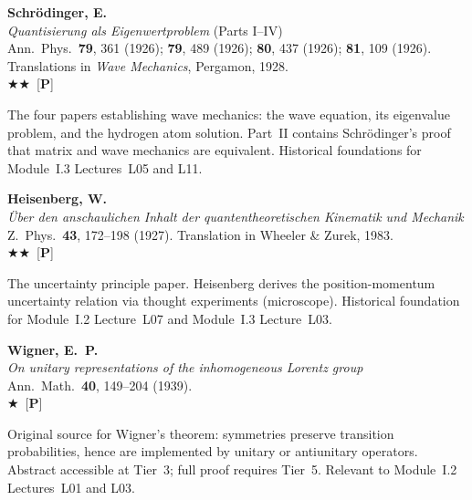 \documentclass[11pt,a4paper]{article}
\newcommand{\recommended}{$\bigstar\bigstar$}
\newcommand{\useful}{$\bigstar$}
\newenvironment{bibentry}[1]{\begin{tcolorbox}[entrybox=#1,top=4pt,bottom=4pt]}{\end{tcolorbox}\smallskip}
\begin{document}
\begin{bibentry}{t3light}
\textbf{Schr\"odinger, E.}\\
\textit{Quantisierung als Eigenwertproblem} (Parts I--IV)\\
Ann.~Phys.~\textbf{79}, 361 (1926); \textbf{79}, 489 (1926); \textbf{80}, 437 (1926);
\textbf{81}, 109 (1926). Translations in \textit{Wave Mechanics}, Pergamon, 1928.\\[3pt]
\recommended\ [\textbf{P}]\\[3pt]
\begin{tcolorbox}[annotbox]
The four papers establishing wave mechanics: the wave equation, its eigenvalue problem,
and the hydrogen atom solution. Part~II contains Schr\"odinger's proof that matrix
and wave mechanics are equivalent. Historical foundations for Module~I.3 Lectures~L05
and L11.
\end{tcolorbox}
\end{bibentry}

\begin{bibentry}{t3light}
\textbf{Heisenberg, W.}\\
\textit{\"Uber den anschaulichen Inhalt der quantentheoretischen Kinematik und
Mechanik}\\
Z.~Phys.~\textbf{43}, 172--198 (1927). Translation in Wheeler \& Zurek, 1983.\\[3pt]
\recommended\ [\textbf{P}]\\[3pt]
\begin{tcolorbox}[annotbox]
The uncertainty principle paper. Heisenberg derives the position-momentum uncertainty
relation via thought experiments (microscope). Historical foundation for Module~I.2
Lecture~L07 and Module~I.3 Lecture~L03.
\end{tcolorbox}
\end{bibentry}

\begin{bibentry}{t3light}
\textbf{Wigner, E.~P.}\\
\textit{On unitary representations of the inhomogeneous Lorentz group}\\
Ann.~Math.~\textbf{40}, 149--204 (1939).\\[3pt]
\useful\ [\textbf{P}]\\[3pt]
\begin{tcolorbox}[annotbox]
Original source for Wigner's theorem: symmetries preserve transition probabilities,
hence are implemented by unitary or antiunitary operators. Abstract accessible at
Tier~3; full proof requires Tier~5. Relevant to Module~I.2 Lectures~L01 and L03.
\end{tcolorbox}
\end{bibentry}
\end{document}
